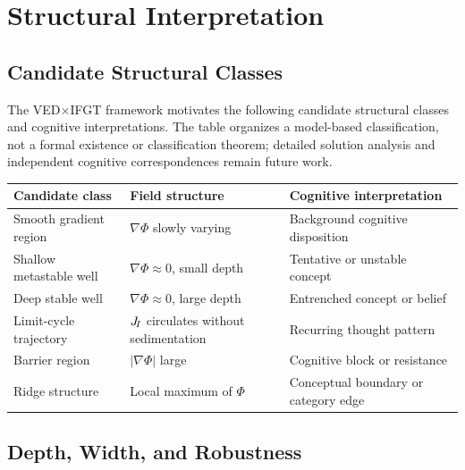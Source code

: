 
\section{Structural Interpretation}
\label{sec:structural}

\subsection{Candidate Structural Classes}

The VED$\times$IFGT framework motivates the following candidate
structural classes and cognitive interpretations.
The table organizes a model-based classification, not a formal existence
or classification theorem; detailed solution analysis and independent
cognitive correspondences remain future work.

\begin{center}
\renewcommand{\arraystretch}{1.5}
\begin{tabular}{p{}p{}p{}}
\toprule
\textbf{Candidate class} & \textbf{Field structure} & \textbf{Cognitive interpretation} \\
\midrule
Smooth gradient region   & $\nabla\Phi$ slowly varying     & Background cognitive disposition \\
Shallow metastable well  & $\nabla\Phi\approx 0$, small depth & Tentative or unstable concept \\
Deep stable well         & $\nabla\Phi\approx 0$, large depth & Entrenched concept or belief \\
Limit-cycle trajectory   & $J_{\!I}$ circulates without sedimentation & Recurring thought pattern \\
Barrier region           & $|\nabla\Phi|$ large             & Cognitive block or resistance \\
Ridge structure          & Local maximum of $\Phi$           & Conceptual boundary or category edge \\
\bottomrule
\end{tabular}
\end{center}

\subsection{Depth, Width, and Robustness}

